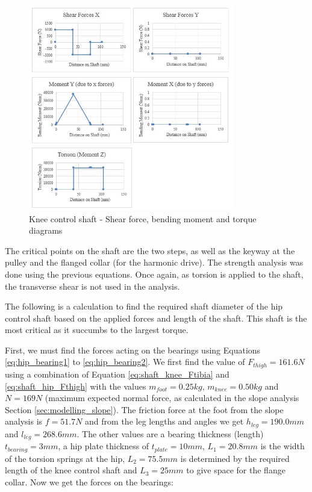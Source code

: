 \begin{figure}
    \centering
    \includegraphics[width=0.8\textwidth]{4_Analysis/img/Shafts/ShaftHipKneeDiagrams.JPG}
    \caption{Knee control shaft - Shear force, bending moment and torque diagrams}
    \label{fig:shaft_hipknee_diagrams}
\end{figure}

The critical points on the shaft are the two steps, as well as the keyway at the pulley and the flanged collar (for the harmonic drive). The strength analysis was done using the previous equations. Once again, as torsion is applied to the shaft, the transverse shear is not used in the analysis.

 \label{sec:shaft_example}

The following is a calculation to find the required shaft diameter of the hip control shaft based on the applied forces and length of the shaft. This shaft is the most critical as it succumbs to the largest torque.

First, we must find the forces acting on the bearings using Equations \ref{eq:hip_bearing1} to \ref{eq:hip_bearing2}. We first find the value of $F_{thigh}=161.6 N$ using a combination of Equation \ref{eq:shaft_knee_Ftibia} and \ref{eq:shaft_hip_Fthigh} with the values $m_{foot}=0.25 kg$, $m_{knee}=0.50 kg$ and $N=169 N$ (maximum expected normal force, as calculated in the slope analysis Section \ref{sec:modelling_slope}). The friction force at the foot from the slope analysis is $f=51.7 N$ and from the leg lengths and angles we get $h_{leg}=190.0 mm$ and $l_{leg}=268.6 mm$. The other values are a bearing thickness (length) $t_{bearing}= 3 mm$, a hip plate thickness of $t_{plate}=10 mm$, $L_1 = 20.8 mm$ is the width of the torsion springs at the hip, $L_2 = 75.5 mm$ is determined by the required length of the knee control shaft and $L_3=25 mm$ to give space for the flange collar. Now we get the forces on the bearings:

